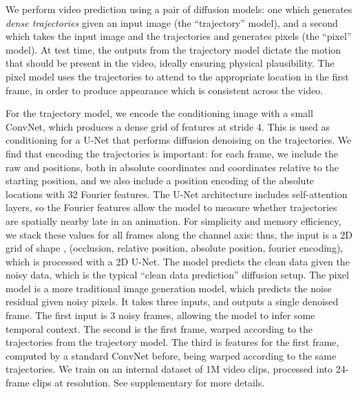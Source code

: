 \documentclass[10pt,twocolumn,letterpaper]{article}
\begin{document}
We perform video prediction using a pair of diffusion models: one which generates \emph{dense trajectories} given an input image (the ``trajectory'' model), and a second which takes the input image and the trajectories and generates pixels (the ``pixel'' model).  At test time, the outputs from the trajectory model dictate the motion that should be present in the video, ideally ensuring physical plausibility.
The pixel model uses the trajectories to attend to the appropriate location in the first frame, in order to produce appearance which is consistent across the video.  


For the trajectory model, we encode the conditioning image with a
small ConvNet, which produces a dense grid of features at stride 4.  This is used as conditioning for a U-Net that performs diffusion denoising on the trajectories.
We find that encoding the trajectories is important: for each frame, we include the raw  and  positions, both in absolute coordinates and coordinates relative to the starting position, and we also include a position encoding of the absolute locations with 32 Fourier features.  The U-Net architecture includes self-attention layers, so the Fourier features allow the model to measure whether trajectories are spatially nearby late in an animation.  
For simplicity and memory efficiency, we stack these values for all frames along the channel axis: thus, the input is a 2D grid of shape , (occlusion, relative position, absolute position, fourier encoding), which is processed with a 2D U-Net.
The model predicts the clean data given the noisy data, which is the typical ``clean data prediction'' diffusion setup.  The pixel model is a more traditional image generation model, which predicts the noise residual given noisy pixels.  It takes three inputs, and outputs a single denoised frame.  The first input is 3 noisy frames, allowing the model to infer some temporal context.  The second is the first frame, warped according to the trajectories from the trajectory model.  The third is features for the first frame, computed by a standard ConvNet before, being warped according to the same trajectories.  We train on an internal dataset of 1M video clips, processed into 24-frame clips at  resolution.  See supplementary for more details.
\end{document}

